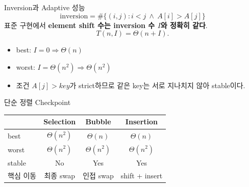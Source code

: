 \begin{frame}{Inversion과 Adaptive 성능}
\[\text{inversion}=\#\{(i,j):i<j\ \land\ A[i]>A[j]\}\]
표준 구현에서 \textbf{element shift 수는 inversion 수 $I$와 정확히 같다}.
\[
T(n,I)=\Theta(n+I).
\]
\begin{itemize}\item best: $I=0\Rightarrow\Theta(n)$\item worst: $I=\Theta(n^2)\Rightarrow\Theta(n^2)$\item 조건 $A[j]>key$가 strict하므로 같은 key는 서로 지나치지 않아 stable이다.\end{itemize}
\end{frame}
\begin{frame}{단순 정렬 Checkpoint}
\begin{tabular}{lccc}\toprule&Selection&Bubble&Insertion\\\midrule best&$\Theta(n^2)$&$\Theta(n)$&$\Theta(n)$\\worst&$\Theta(n^2)$&$\Theta(n^2)$&$\Theta(n^2)$\\stable&No&Yes&Yes\\핵심 이동&최종 swap&인접 swap&shift + insert\\\bottomrule\end{tabular}
\end{frame}
